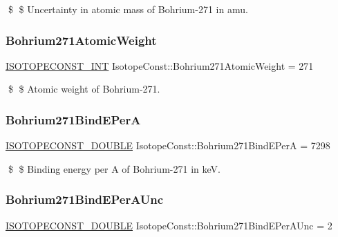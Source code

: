 \$ \$ Uncertainty in atomic mass of Bohrium-\/271 in amu. \mbox{\label{group___isotope_const-_bohrium-_bh271_ga75fbc5febe8660a6523a42cd37b62291}} 
\subsubsection{\texorpdfstring{Bohrium271\+Atomic\+Weight}{Bohrium271AtomicWeight}}
{\footnotesize\ttfamily \mbox{\hyperlink{group___isotope_const-_macros_ga5f18360b3e99483a35c32d789e62621c}{I\+S\+O\+T\+O\+P\+E\+C\+O\+N\+S\+T\+\_\+\+I\+NT}} Isotope\+Const\+::\+Bohrium271\+Atomic\+Weight = 271}

\$ \$ Atomic weight of Bohrium-\/271. \mbox{\label{group___isotope_const-_bohrium-_bh271_ga1944823ce2a854996e24932bbc909be7}} 
\subsubsection{\texorpdfstring{Bohrium271\+Bind\+E\+PerA}{Bohrium271BindEPerA}}
{\footnotesize\ttfamily \mbox{\hyperlink{group___isotope_const-_macros_ga8f45a7272ce02c0b4c65c44636ed719a}{I\+S\+O\+T\+O\+P\+E\+C\+O\+N\+S\+T\+\_\+\+D\+O\+U\+B\+LE}} Isotope\+Const\+::\+Bohrium271\+Bind\+E\+PerA = 7298}

\$ \$ Binding energy per A of Bohrium-\/271 in keV. \mbox{\label{group___isotope_const-_bohrium-_bh271_ga71d2f952fdb4755d562f443f5466fd7a}} 
\subsubsection{\texorpdfstring{Bohrium271\+Bind\+E\+Per\+A\+Unc}{Bohrium271BindEPerAUnc}}
{\footnotesize\ttfamily \mbox{\hyperlink{group___isotope_const-_macros_ga8f45a7272ce02c0b4c65c44636ed719a}{I\+S\+O\+T\+O\+P\+E\+C\+O\+N\+S\+T\+\_\+\+D\+O\+U\+B\+LE}} Isotope\+Const\+::\+Bohrium271\+Bind\+E\+Per\+A\+Unc = 2}

